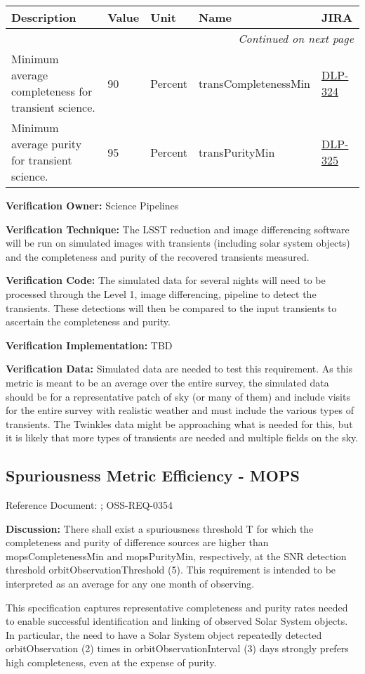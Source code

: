 \documentclass[DM,lsstdraft,toc]{lsstdoc}
\makeatletter
\newcommand{\jira}[1]{\href{https://jira.lsstcorp.org/browse/#1}{#1}}
\newenvironment{metric}[0]{%
\setlength\LTleft{0pt}
\setlength\LTright{\fill}
\begin{longtable}[]{@{}p{0.4\textwidth}lp{0.75in}p{1.3in}p{0.75in}@{}}

\hline \textbf{Description} & \textbf{Value} & \textbf{Unit} & \textbf{Name} & \textbf{JIRA} \\ \hline
\endhead

\hline \multicolumn{5}{r}{\emph{Continued on next page}} \\
\endfoot

\hline\hline
\endlastfoot
}{%
\hline
\end{longtable}
}
\makeatother
\begin{document}
\begin{metric}
Minimum average completeness for transient science. & 90 & Percent &
trans\-Completeness\-Min & \jira{DLP-324}\tabularnewline
Minimum average purity for transient science. & 95 & Percent &
transPurityMin & \jira{DLP-325}\tabularnewline
\end{metric}

\textbf{Verification Owner:} Science Pipelines

\textbf{Verification Technique:} The LSST reduction and image
differencing software will be run on simulated images with transients
(including solar system objects) and the completeness and purity of the
recovered transients measured.

\textbf{Verification Code:} The simulated data for several nights will
need to be processed through the Level 1, image differencing, pipeline
to detect the transients. These detections will then be compared to the
input transients to ascertain the completeness and purity.

\textbf{Verification Implementation:} TBD

\textbf{Verification Data:} Simulated data are needed to test this
requirement. As this metric is meant to be an average over the entire
survey, the simulated data should be for a representative patch of sky
(or many of them) and include visits for the entire survey with
realistic weather and must include the various types of transients. The
Twinkles data might be approaching what is needed for this, but it is
likely that more types of transients are needed and multiple fields on
the sky.

\subsection{Spuriousness Metric Efficiency -
MOPS}\label{spuriousness-metric-efficiency---mops}

Reference Document: ; OSS-REQ-0354

\textbf{Discussion:} There shall exist a spuriousness threshold T for
which the completeness and purity of difference sources are higher than
mopsCompletenessMin and mopsPurityMin, respectively, at the SNR
detection threshold orbitObservationThreshold (5). This requirement is
intended to be interpreted as an average for any one month of observing.

This specification captures representative completeness and purity rates
needed to enable successful identification and linking of observed Solar
System objects. In particular, the need to have a Solar System object
repeatedly detected orbitObservation (2) times in
orbitObservationInterval (3) days strongly prefers high completeness,
even at the expense of purity.
\end{document}
